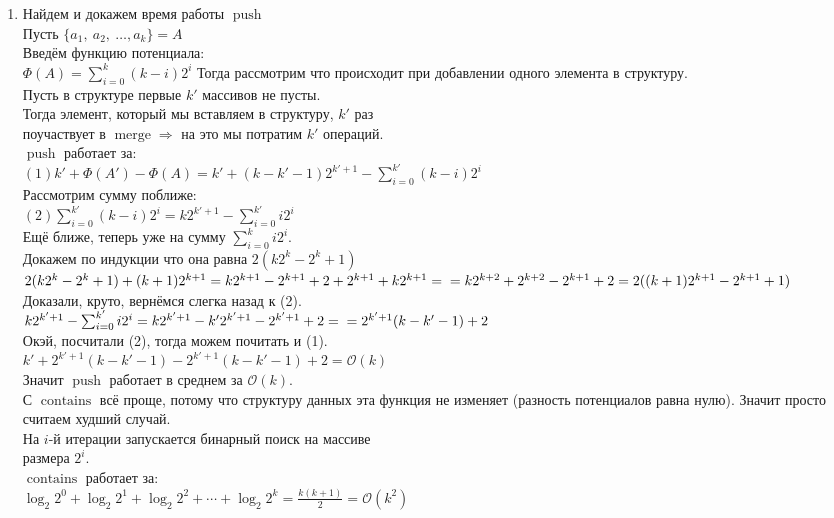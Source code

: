 \documentclass[a4paper, 10pt]{article}
\begin{document}
\begin{enumerate}
\item
\begin{enumerate}
	Найдем и докажем время работы $\operatorname{push}$\\
	Пусть $\{a_1, \medspace a_2, \medspace \ldots, a_k\} = A$\\
	Введём функцию потенциала:\\
	$\Phi(A) = \sum_{i=0}^{k}(k - i)2^i$
	Тогда рассмотрим что происходит при добавлении одного элемента в структуру.\\
	Пусть в структуре первые $k'$ массивов не пусты.\\
	Тогда элемент, который мы вставляем в структуру, $k'$ раз\\
	поучаствует в $\operatorname{merge} \Rightarrow $ на это мы потратим $k'$ операций.\\
	$\operatorname{push}$ работает за:\\
	$(1)k' + \Phi(A') - \Phi(A) = k' + (k - k' - 1)2^{k' + 1} - \sum_{i=0}^{k'}(k - i)2^i$\\
	Рассмотрим сумму поближе:\\
	$(2)\sum_{i=0}^{k'}(k - i)2^i = k2^{k' + 1} - \sum_{i=0}^{k'}i2^i$\\
	Ещё ближе, теперь уже на сумму $\sum_{i=0}^{k}i2^i$.\\
	Докажем по индукции что она равна $2(k2^k - 2^k + 1)$\\
	$2(k2^k - 2^k + 1) + (k + 1)2^{k + 1} = k2^{k + 1} - 2^{k + 1} + 2 + 2^{k + 1} + k2^{k + 1} = \\
	= k2^{k + 2} + 2^{k + 2} - 2^{k + 1} + 2 = 2((k + 1)2^{k + 1} - 2^{k + 1} + 1)$\\
	Доказали, круто, вернёмся слегка назад к (2).\\
	$k2^{k' + 1} - \sum_{i=0}^{k'}i2^i = k2^{k' + 1} - k'2^{k' + 1} - 2^{k' + 1} + 2 = \\
	= 2^{k' + 1}(k - k' - 1) + 2$\\
	Окэй, посчитали (2), тогда можем почитать и (1).\\
	$k' + 2^{k' + 1}(k - k' - 1) - 2^{k' + 1}(k - k' - 1) + 2 = \mathcal{O}(k)$\\
	Значит $\operatorname{push}$ работает в среднем за $\mathcal{O}(k)$.\\
	\quad С $\operatorname{contains}$ всё проще, потому что структуру данных эта функция не изменяет (разность потенциалов равна нулю). Значит просто считаем худший случай.\\
	На $i$-й итерации запускается бинарный поиск на массиве\\размера $2^i$.\\
	$\operatorname{contains}$ работает за:\\
	$\log_2{2^0} + \log_2{2^1} + \log_2{2^2} + \cdots + \log_2{2^k} = \frac{k(k + 1)}{2} = \mathcal{O}(k^2)$\\
\end{enumerate}

\end{enumerate}
\end{document}
